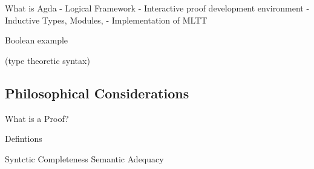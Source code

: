 \documentclass{beamer}
\begin{document}
\begin{frame}

What is Agda
- Logical Framework
- Interactive proof development environment
- Inductive Types, Modules,
- Implementation of MLTT

\end{frame}

\begin{frame}
Boolean example

(type theoretic syntax)

\end{frame}

\subsection{Philosophical Considerations}


\begin{frame}

  What is a Proof?
  
\end{frame}

\begin{frame}

  Defintions

  Syntctic Completeness
  Semantic Adequacy

\end{frame}

\begin{frame}[fragile]
\centering
{}

\end{frame}
\end{document}
